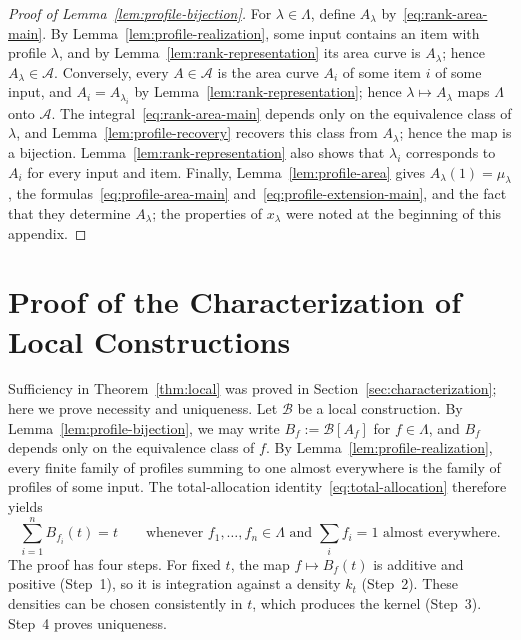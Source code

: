 \documentclass[11pt]{article}
\theoremstyle{definition}
\theoremstyle{remark}
\begin{document}
\begin{proof}[Proof of Lemma~\ref{lem:profile-bijection}]
For $\lambda\in\Lambda$, define $A_\lambda$ by~\eqref{eq:rank-area-main}.
By Lemma~\ref{lem:profile-realization}, some input contains an item with profile $\lambda$, and by Lemma~\ref{lem:rank-representation} its area curve is $A_\lambda$; hence $A_\lambda\in\mathcal A$.
Conversely, every $A\in\mathcal A$ is the area curve $A_i$ of some item $i$ of some input, and $A_i=A_{\lambda_i}$ by Lemma~\ref{lem:rank-representation}; hence $\lambda\mapsto A_\lambda$ maps $\Lambda$ onto $\mathcal A$.
The integral~\eqref{eq:rank-area-main} depends only on the equivalence class of $\lambda$, and Lemma~\ref{lem:profile-recovery} recovers this class from $A_\lambda$; hence the map is a bijection.
Lemma~\ref{lem:rank-representation} also shows that $\lambda_i$ corresponds to $A_i$ for every input and item.
Finally, Lemma~\ref{lem:profile-area} gives $A_\lambda(1)=\mu_\lambda$, the formulas~\eqref{eq:profile-area-main} and~\eqref{eq:profile-extension-main}, and the fact that they determine $A_\lambda$; the properties of $x_\lambda$ were noted at the beginning of this appendix.
\end{proof}

\section{Proof of the Characterization of Local Constructions}\label{app:converse}

Sufficiency in Theorem~\ref{thm:local} was proved in Section~\ref{sec:characterization}; here we prove necessity and uniqueness.
Let $\mathcal B$ be a local construction.
By Lemma~\ref{lem:profile-bijection}, we may write $B_f:=\mathcal B[A_f]$ for $f\in\Lambda$, and $B_f$ depends only on the equivalence class of $f$.
By Lemma~\ref{lem:profile-realization}, every finite family of profiles summing to one almost everywhere is the family of profiles of some input.
The total-allocation identity~\eqref{eq:total-allocation} therefore yields
\begin{equation}\label{eq:partition-identity}
 \sum_{i=1}^nB_{f_i}(t)=t
 \qquad\text{whenever }f_1,\ldots,f_n\in\Lambda\text{ and }\sum_if_i=1\text{ almost everywhere}.
\end{equation}
The proof has four steps.
For fixed $t$, the map $f\mapsto B_f(t)$ is additive and positive (Step~1), so it is integration against a density $k_t$ (Step~2).
These densities can be chosen consistently in $t$, which produces the kernel (Step~3).
Step~4 proves uniqueness.
\end{document}
